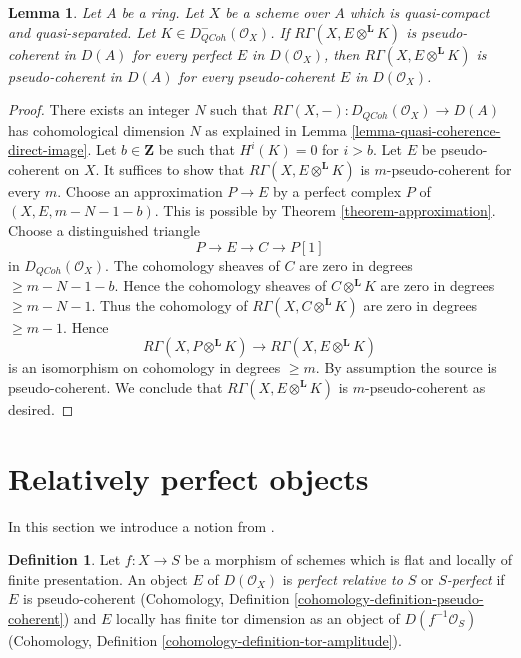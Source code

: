 \documentclass{stacks-project}
\theoremstyle{plain}
\newtheorem{lemma}[subsection]{Lemma}
\theoremstyle{definition}
\newtheorem{definition}[subsection]{Definition}
\theoremstyle{remark}
\numberwithin{equation}{subsection}
\def\QCoh{\mathit{QCoh}}
\begin{document}
\begin{lemma}
\label{lemma-perfect-enough}
Let $A$ be a ring. Let $X$ be a scheme over $A$ which is quasi-compact
and quasi-separated. Let $K \in D^-_\QCoh(\mathcal{O}_X)$.
If $R\Gamma(X, E \otimes^\mathbf{L} K)$ is pseudo-coherent
in $D(A)$ for every perfect $E$ in $D(\mathcal{O}_X)$,
then $R\Gamma(X, E \otimes^\mathbf{L} K)$ is pseudo-coherent
in $D(A)$ for every pseudo-coherent $E$ in $D(\mathcal{O}_X)$.
\end{lemma}

\begin{proof}
There exists an integer $N$ such that
$R\Gamma(X, -) : D_\QCoh(\mathcal{O}_X) \to D(A)$
has cohomological dimension $N$ as explained in
Lemma \ref{lemma-quasi-coherence-direct-image}.
Let $b \in \mathbf{Z}$ be such that $H^i(K) = 0$ for $i > b$.
Let $E$ be pseudo-coherent on $X$.
It suffices to show that $R\Gamma(X, E \otimes^\mathbf{L} K)$
is $m$-pseudo-coherent for every $m$.
Choose an approximation $P \to E$ by a perfect complex $P$
of $(X, E, m - N - 1 - b)$. This is possible by
Theorem \ref{theorem-approximation}.
Choose a distinguished triangle
$$
P \to E \to C \to P[1]
$$
in $D_\QCoh(\mathcal{O}_X)$. The cohomology sheaves of $C$ are zero
in degrees $\geq m - N - 1 - b$. Hence the cohomology
sheaves of $C \otimes^\mathbf{L} K$ are zero in degrees $\geq m - N - 1$.
Thus the cohomology of $R\Gamma(X, C \otimes^\mathbf{L} K)$
are zero in degrees $\geq m - 1$. Hence
$$
R\Gamma(X, P \otimes^\mathbf{L} K) \to R\Gamma(X, E \otimes^\mathbf{L} K)
$$
is an isomorphism on cohomology in degrees $\geq m$.
By assumption the source is pseudo-coherent.
We conclude that $R\Gamma(X, E \otimes^\mathbf{L} K)$
is $m$-pseudo-coherent as desired.
\end{proof}









\section{Relatively perfect objects}
\label{section-relatively-perfect}

\noindent
In this section we introduce a notion from
\cite{lieblich-complexes}.

\begin{definition}
\label{definition-relatively-perfect}
Let $f : X \to S$ be a morphism of schemes which is flat and
locally of finite presentation. An object $E$ of $D(\mathcal{O}_X)$ is
{\it perfect relative to $S$} or
{\it $S$-perfect} if $E$ is pseudo-coherent
(Cohomology, Definition \ref{cohomology-definition-pseudo-coherent}) and
$E$ locally has finite tor dimension as an object of
$D(f^{-1}\mathcal{O}_S)$
(Cohomology, Definition \ref{cohomology-definition-tor-amplitude}).
\end{definition}
\end{document}

